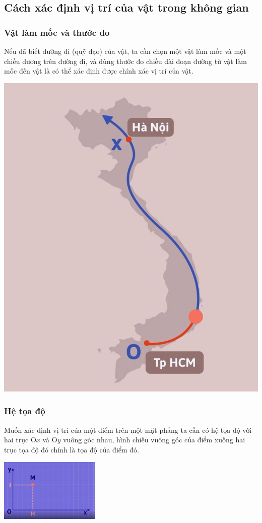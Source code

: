 \subsection{Cách xác định vị trí của vật trong không gian}
\subsubsection{Vật làm mốc và thước đo}
Nếu đã biết đường đi (quỹ đạo) của vật, ta cần chọn một vật làm mốc và một chiều dương trên đường đi, và dùng thước đo chiều dài đoạn đường từ vật làm mốc đến vật là có thể xác định được chính xác vị trí của vật.
\begin{center}
	\includegraphics[scale=0.3]{../figs/VN10-PH-02-L-001-1-V2-01.jpg}
\end{center}
\subsubsection{Hệ tọa độ}
Muốn xác định vị trí của một điểm trên một mặt phẳng ta cần có hệ tọa độ với hai trục O$x$ và O$y$ vuông góc nhau, hình chiếu vuông góc của điểm xuống hai trục tọa độ đó chính là tọa độ của điểm đó.
\begin{center}
	\includegraphics[height=3cm]{../figs/VN10-PH-02-L-001-1-V2-02.jpg}
\end{center}
